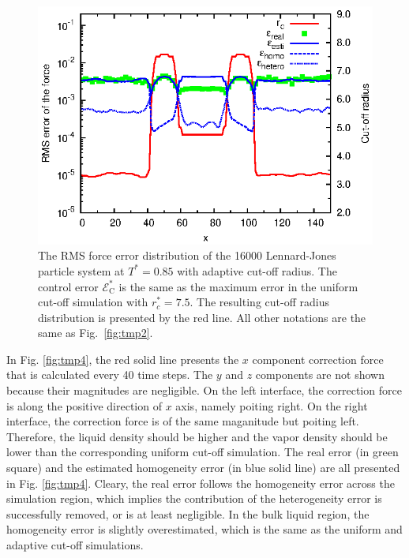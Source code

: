 \documentclass[aps,pre,preprint]{revtex4-1}
\begin{document}
\begin{figure}
  \centering
  \includegraphics[]{fig/t0.85-n16000-adapt-e0.0045-extend/rcut.and.error.eps}
  \caption{ The RMS force error distribution of the 16000
    Lennard-Jones particle system at $T^\ast=0.85$ with adaptive
    cut-off radius. The control error $\mathcal E^\ast_{\textrm{C}}$
    is the same as the maximum error in the uniform cut-off simulation
    with $r_c^\ast=7.5$.  The resulting cut-off radius distribution is
    presented by the red line. All other notations are the same as
    Fig.~\ref{fig:tmp2}.}
  \label{fig:tmp3}
\end{figure}


In Fig. \ref{fig:tmp4}, the red solid line presents the $x$ component
correction force that is calculated every 40 time steps. The $y$ and
$z$ components are not shown because their magnitudes are negligible.
On the left interface, the correction force is along the positive
direction of $x$ axis, namely poiting right.  On the right interface,
the correction force is of the same maganitude but poiting
left. Therefore, the liquid density should be higher and the vapor
density should be lower than the corresponding uniform cut-off
simulation.  The real error (in green square) and the estimated
homogeneity error (in blue solid line) are all presented in
Fig. \ref{fig:tmp4}.  Cleary, the real error follows the homogeneity
error across the simulation region, which implies the contribution of
the heterogeneity error is successfully removed, or is at least
negligible. In the bulk liquid region, the homogeneity error is
slightly overestimated, which is the same as the uniform and adaptive
cut-off simulations.
\end{document}
